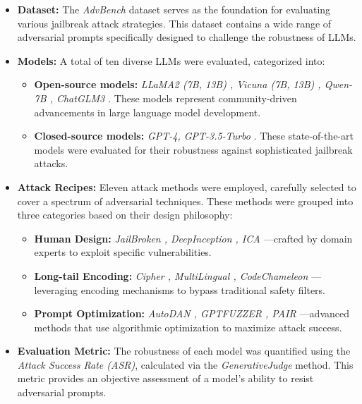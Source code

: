 \documentclass[18pt]{article}
\begin{document}
\begin{itemize}
    \item \textbf{Dataset:} The \textit{AdvBench} \cite{gcg} dataset serves as the foundation for evaluating various jailbreak attack strategies. This dataset contains a wide range of adversarial prompts specifically designed to challenge the robustness of LLMs.
    \item \textbf{Models:} A total of ten diverse LLMs were evaluated, categorized into:
    \begin{itemize}
        \item \textbf{Open-source models:} \textit{LLaMA2 (7B, 13B) \cite{touvron2023llama}, Vicuna (7B, 13B) \cite{vicuna}, Qwen-7B \cite{bai2023qwen}, ChatGLM3 \cite{du2022glm}}. These models represent community-driven advancements in large language model development.
        \item \textbf{Closed-source models:} \textit{GPT-4, GPT-3.5-Turbo} \cite{achiam2023gpt}. These state-of-the-art models were evaluated for their robustness against sophisticated jailbreak attacks.
    \end{itemize}
    \item \textbf{Attack Recipes:} 
    Eleven attack methods were employed, carefully selected to cover a spectrum of adversarial techniques. These methods were grouped into three categories based on their design philosophy:
    \begin{itemize}
        \item \textbf{Human Design:} \textit{JailBroken \cite{jailbroken}, DeepInception \cite{DeepInception}, ICA \cite{ica}}—crafted by domain experts to exploit specific vulnerabilities.
        \item \textbf{Long-tail Encoding:} \textit{Cipher \cite{cipher}, MultiLingual \cite{multilingual}, CodeChameleon \cite{lv2024codechameleon}}—leveraging encoding mechanisms to bypass traditional safety filters.
        \item \textbf{Prompt Optimization:} \textit{AutoDAN \cite{autodanliu2023}, GPTFUZZER \cite{gptfuzz}, PAIR \cite{pair}}—advanced methods that use algorithmic optimization to maximize attack success.
    \end{itemize}
    \item \textbf{Evaluation Metric:} The robustness of each model was quantified using the \textit{Attack Success Rate (ASR)}, calculated via the \textit{GenerativeJudge} method. This metric provides an objective assessment of a model's ability to resist adversarial prompts.
\end{itemize}
\end{document}
